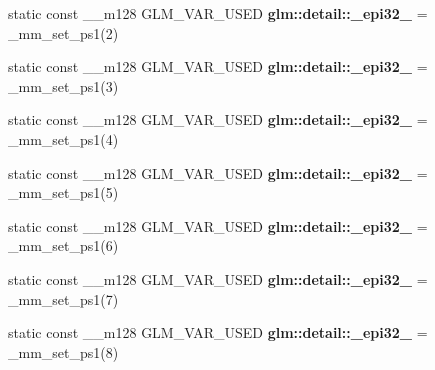 \begin{DoxyCompactItemize}
\item 
\hypertarget{namespaceglm_1_1detail_a66863390dd4caf7fa2ab9deb64668fed}{}static const \+\_\+\+\_\+m128 G\+L\+M\+\_\+\+V\+A\+R\+\_\+\+U\+S\+E\+D {\bfseries glm\+::detail\+::\+\_\+epi32\+\_} = \+\_\+mm\+\_\+set\+\_\+ps1(2)\label{namespaceglm_1_1detail_a66863390dd4caf7fa2ab9deb64668fed}

\item 
\hypertarget{namespaceglm_1_1detail_ac451357910ebf53a13d32e48c03613a7}{}static const \+\_\+\+\_\+m128 G\+L\+M\+\_\+\+V\+A\+R\+\_\+\+U\+S\+E\+D {\bfseries glm\+::detail\+::\+\_\+epi32\+\_} = \+\_\+mm\+\_\+set\+\_\+ps1(3)\label{namespaceglm_1_1detail_ac451357910ebf53a13d32e48c03613a7}

\item 
\hypertarget{namespaceglm_1_1detail_a0972c0b4c4e183556ecf20386838a57b}{}static const \+\_\+\+\_\+m128 G\+L\+M\+\_\+\+V\+A\+R\+\_\+\+U\+S\+E\+D {\bfseries glm\+::detail\+::\+\_\+epi32\+\_} = \+\_\+mm\+\_\+set\+\_\+ps1(4)\label{namespaceglm_1_1detail_a0972c0b4c4e183556ecf20386838a57b}

\item 
\hypertarget{namespaceglm_1_1detail_ac103c2e3e19f1f62f95ce8f206f02812}{}static const \+\_\+\+\_\+m128 G\+L\+M\+\_\+\+V\+A\+R\+\_\+\+U\+S\+E\+D {\bfseries glm\+::detail\+::\+\_\+epi32\+\_} = \+\_\+mm\+\_\+set\+\_\+ps1(5)\label{namespaceglm_1_1detail_ac103c2e3e19f1f62f95ce8f206f02812}

\item 
\hypertarget{namespaceglm_1_1detail_a5bbb5759861c895180e7c6a75ddd3539}{}static const \+\_\+\+\_\+m128 G\+L\+M\+\_\+\+V\+A\+R\+\_\+\+U\+S\+E\+D {\bfseries glm\+::detail\+::\+\_\+epi32\+\_} = \+\_\+mm\+\_\+set\+\_\+ps1(6)\label{namespaceglm_1_1detail_a5bbb5759861c895180e7c6a75ddd3539}

\item 
\hypertarget{namespaceglm_1_1detail_af722cf4a26b582bf95b22c6fbf8e9673}{}static const \+\_\+\+\_\+m128 G\+L\+M\+\_\+\+V\+A\+R\+\_\+\+U\+S\+E\+D {\bfseries glm\+::detail\+::\+\_\+epi32\+\_} = \+\_\+mm\+\_\+set\+\_\+ps1(7)\label{namespaceglm_1_1detail_af722cf4a26b582bf95b22c6fbf8e9673}

\item 
\hypertarget{namespaceglm_1_1detail_a5ef280330f2a40def8fccc6a5849494b}{}static const \+\_\+\+\_\+m128 G\+L\+M\+\_\+\+V\+A\+R\+\_\+\+U\+S\+E\+D {\bfseries glm\+::detail\+::\+\_\+epi32\+\_} = \+\_\+mm\+\_\+set\+\_\+ps1(8)\label{namespaceglm_1_1detail_a5ef280330f2a40def8fccc6a5849494b}


\end{DoxyCompactItemize}
